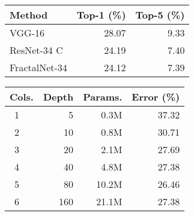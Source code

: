 \documentclass{article}
\newcommand{\Fracnet}{FractalNet}
\newcommand{\Resnet}{ResNet}
\begin{document}
\begin{figure}
   \begin{minipage}[b]{0.45\linewidth}
      \vspace{0pt}
\begin{center}
      \begin{tabular}{@{}lrr@{}}
Method            & Top-1 (\%) & Top-5  (\%) \\
\toprule
VGG-16            & 28.07      & 9.33 \\
{\Resnet}-34 C    & 24.19      & 7.40 \\
{\Fracnet}-34     & 24.12      & 7.39 \\
\bottomrule
\end{tabular}
       \end{center}
      \vspace{-0.04\linewidth}
      \label{tab:imagenet}
      \vspace{0.03\linewidth}
\begin{center}
      \begin{tabular}{@{}lrrr@{}}
  Cols. & Depth  & Params.    &  Error (\%)\\
\toprule
     ~1 &      5 &       0.3M &      37.32 \\   ~2 &     10 &       0.8M &      30.71 \\   ~3 &     20 &       2.1M &      27.69 \\   ~4 &     40 &       4.8M &      27.38 \\   ~5 &     80 &      10.2M &      26.46 \\   ~6 &    160 &      21.1M &      27.38 \\   \bottomrule
\end{tabular}
       \end{center}
      \vspace{-0.04\linewidth}
      \label{tab:columns}
   \end{minipage}
   \hfill
   \begin{minipage}[b]{0.51\linewidth}
      \vspace{0pt}
      \begin{center}
      \begin{tabular}{@{}lrrr@{}}

\end{tabular}
\end{center}
\end{minipage}
\end{figure}
\end{document}
